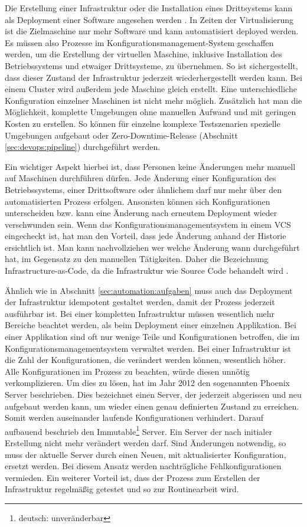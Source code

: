 Die Erstellung einer Infrastruktur oder die Installation eines Drittsystems kann als Deployment einer Software angesehen werden \cite{wolff2014}. In Zeiten der Virtualisierung ist die Zielmaschine nur mehr Software und kann automatisiert deployed werden. Es müssen also Prozesse im Konfigurationsmanagement-System geschaffen werden, um die Erstellung der virtuellen Maschine, inklusive Installation des Betriebssystems und etwaiger Drittsysteme, zu übernehmen. So ist sichergestellt, dass dieser Zustand der Infrastruktur jederzeit wiederhergestellt werden kann. Bei einem Cluster wird außerdem jede Maschine gleich erstellt. Eine unterschiedliche Konfiguration einzelner Maschinen ist nicht mehr möglich. Zusätzlich hat man die Möglichkeit, komplette Umgebungen ohne manuellen Aufwand und mit geringen Kosten zu erstellen. So können für einzelne komplexe Testszenarien spezielle Umgebungen aufgebaut oder Zero-Downtime-Release (Abschnitt \ref{sec:devops:pipeline}) durchgeführt werden.

Ein wichtiger Aspekt hierbei ist, dass Personen keine Änderungen mehr manuell auf Maschinen durchführen dürfen. Jede Änderung einer Konfiguration des Betriebssystems, einer Drittsoftware oder ähnlichem darf nur mehr über den automatisierten Prozess erfolgen. Ansonsten können sich Konfigurationen unterscheiden bzw. kann eine Änderung nach erneutem Deployment wieder verschwunden sein. Wenn das Konfigurationsmanagementsystem in einem VCS eingecheckt ist, hat man den Vorteil, dass jede Änderung anhand der Historie ersichtlich ist. Man kann nachvollziehen wer welche Änderung wann durchgeführt hat, im Gegensatz zu den manuellen Tätigkeiten. Daher die Bezeichnung Infrastructure-as-Code, da die Infrastruktur wie Source Code behandelt wird \cite{wolff2014}.

Ähnlich wie in Abschnitt \ref{sec:automation:aufgaben} muss auch das Deployment der Infrastruktur idempotent gestaltet werden, damit der Prozess jederzeit ausführbar ist. Bei einer kompletten Infrastruktur müssen wesentlich mehr Bereiche beachtet werden, als beim Deployment einer einzelnen Applikation. Bei einer Applikation sind oft nur wenige Teile und Konfigurationen betroffen, die im Konfigurationsmanagementsystem verwaltet werden. Bei einer Infrastruktur ist die Zahl der Konfigurationen, die verändert werden können, wesentlich höher. Alle Konfigurationen im Prozess zu beachten, würde diesen unnötig verkomplizieren. Um dies zu lösen, hat \cite{fowler2012} im Jahr 2012 den sogenannten Phoenix Server beschrieben. Dies bezeichnet einen Server, der jederzeit abgerissen und neu aufgebaut werden kann, um wieder einen genau definierten Zustand zu erreichen. Somit werden auseinander laufende Konfigurationen verhindert. Darauf aufbauend beschrieb \cite{morris2013} den Immutable\footnote{deutsch: unveränderbar} Server. Ein Server der nach initialer Erstellung nicht mehr verändert werden darf. Sind Änderungen notwendig, so muss der aktuelle Server durch einen Neuen, mit aktualisierter Konfiguration, ersetzt werden. Bei diesem Ansatz werden nachträgliche Fehlkonfigurationen vermieden. Ein weiterer Vorteil ist, dass der Prozess zum Erstellen der Infrastruktur regelmäßig getestet und so zur Routinearbeit wird. 

